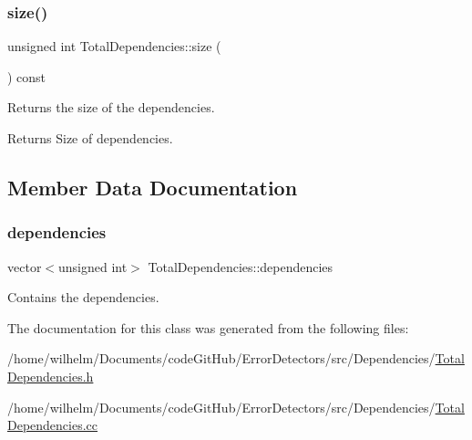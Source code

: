 \subsubsection{\texorpdfstring{size()}{size()}}
{\footnotesize\ttfamily unsigned int Total\+Dependencies\+::size (\begin{DoxyParamCaption}{ }\end{DoxyParamCaption}) const}



Returns the size of the dependencies. 

\begin{DoxyReturn}{Returns}
Size of dependencies. 
\end{DoxyReturn}


\subsection{Member Data Documentation}
\mbox{\label{class_total_dependencies_a94825b4f782c30dfebf69dd2eba0bb1f}} 
\subsubsection{\texorpdfstring{dependencies}{dependencies}}
{\footnotesize\ttfamily vector$<$unsigned int$>$ Total\+Dependencies\+::dependencies\hspace{0.3cm}{\ttfamily [private]}}



Contains the dependencies. 



The documentation for this class was generated from the following files\+:\begin{DoxyCompactItemize}
\item 
/home/wilhelm/\+Documents/code\+Git\+Hub/\+Error\+Detectors/src/\+Dependencies/\hyperlink{_total_dependencies_8h}{Total\+Dependencies.\+h}\item 
/home/wilhelm/\+Documents/code\+Git\+Hub/\+Error\+Detectors/src/\+Dependencies/\hyperlink{_total_dependencies_8cc}{Total\+Dependencies.\+cc}\end{DoxyCompactItemize}
